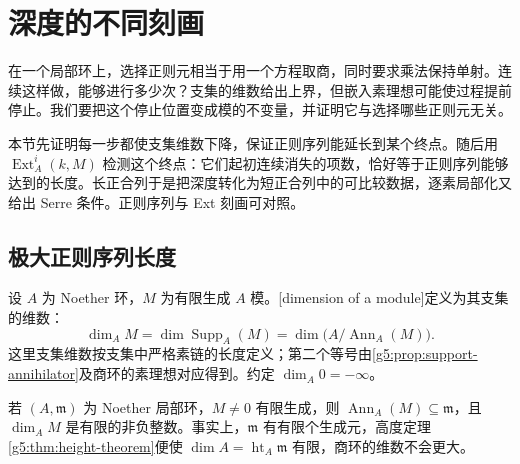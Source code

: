 
% 
% 

\section{深度的不同刻画}
\label{g5:sec:0803}

在一个局部环上，选择正则元相当于用一个方程取商，同时要求乘法保持单射。连续这样做，能够进行多少次？支集的维数给出上界，但嵌入素理想可能使过程提前停止。我们要把这个停止位置变成模的不变量，并证明它与选择哪些正则元无关。

\ProseParagraphBreak

本节先证明每一步都使支集维数下降，保证正则序列能延长到某个终点。随后用 \(\operatorname{Ext}^i_A(k,M)\) 检测这个终点：它们起初连续消失的项数，恰好等于正则序列能够达到的长度。长正合列于是把深度转化为短正合列中的可比较数据，逐素局部化又给出 Serre 条件。正则序列与 Ext 刻画可对照\cite[第16节，定理16.6—16.7，第129—131页]{Matsumura1989}。

\subsection{极大正则序列长度}
\label{g5:subsec:0803:01}

\begin{definition}\label{g5:def:module-dimension}
	设 \(A\) 为 Noether 环，\(M\) 为有限生成 \(A\) 模。[dimension of a module]定义为其支集的维数：
	\[
		\dim_A M=\dim\operatorname{Supp}_A(M)
		=\dim\bigl(A/\operatorname{Ann}_A(M)\bigr).
	\]
	这里支集维数按支集中严格素链的长度定义；第二个等号由\cref{g5:prop:support-annihilator}及商环的素理想对应得到。约定 \(\dim_A0=-\infty\)。
\end{definition}

若 \((A,\mathfrak m)\) 为 Noether 局部环，\(M\ne0\) 有限生成，则 \(\operatorname{Ann}_A(M)\subseteq\mathfrak m\)，且 \(\dim_A M\) 是有限的非负整数。事实上，\(\mathfrak m\) 有有限个生成元，高度定理 \cref{g5:thm:height-theorem}便使 \(\dim A=\operatorname{ht}_A\mathfrak m\) 有限，商环的维数不会更大。

